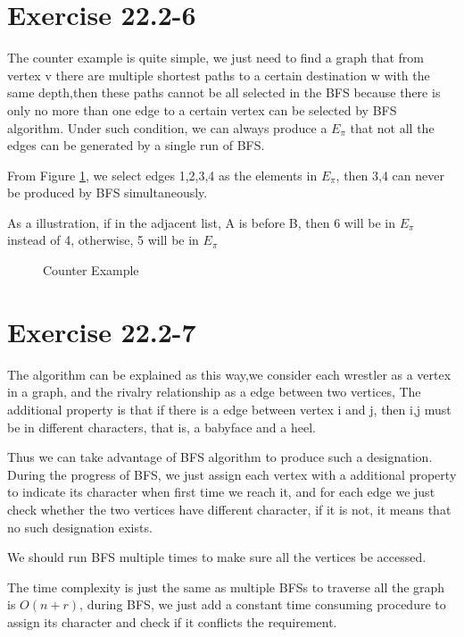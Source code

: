 \documentclass[oneside]{homework} %
\begin{document}
\maketitle
\newpage
\section*{Exercise 22.2-6}
The counter example is quite simple, we just need to find a graph that from vertex v there are multiple shortest paths to a certain destination w with the same depth,then these paths cannot be all selected in the BFS because there is only no more than one edge to a certain vertex can be selected by BFS algorithm. Under such condition, we can always produce a $E_{\pi}$ that not all the edges can be generated by a single run of BFS. 

From Figure \ref{fig:ce1}, we select edges 1,2,3,4 as the elements in $E_{\pi}$, then 3,4 can never be produced by BFS simultaneously.

As a illustration, if in the adjacent list, A is before B, then 6 will be in $E_{\pi}$ instead of 4, otherwise, 5 will be in $E_{\pi}$

\begin{figure}[hc]
  \centering
  \caption{Counter Example}
  \label{fig:ce1}
\end{figure}



\section*{Exercise 22.2-7}
The algorithm can be explained as this way,we consider each wrestler as a vertex in a graph, and the rivalry relationship as a edge between two vertices, The additional property is that if there is a edge between vertex i and j, then i,j must be in different characters, that is, a babyface and a heel.

Thus we can take advantage of BFS algorithm to produce such a designation. During the progress of BFS, we just assign each vertex with a additional property to indicate its character when first time we reach it, and for each edge we just check whether the two vertices have different character, if it is not, it means that no such designation exists.

We should run BFS multiple times to make sure all the vertices be accessed. 

The time complexity is just the same as multiple BFSs to traverse all the graph is $O(n+r)$, during BFS, we just add a constant time consuming procedure to assign its character and check if it conflicts the requirement.
\end{document}
